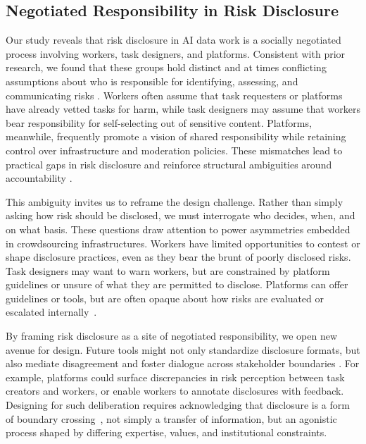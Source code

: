 \subsection{Negotiated Responsibility in Risk Disclosure}
Our study reveals that risk disclosure in AI data work is a socially negotiated process involving workers, task designers, and platforms. Consistent with prior research, we found that these groups hold distinct and at times conflicting assumptions about who is responsible for identifying, assessing, and communicating risks \cite{fieseler_unfairness_2019}. Workers often assume that task requesters or platforms have already vetted tasks for harm, while task designers may assume that workers bear responsibility for self-selecting out of sensitive content. Platforms, meanwhile, frequently promote a vision of shared responsibility while retaining control over infrastructure and moderation policies. These mismatches lead to practical gaps in risk disclosure and reinforce structural ambiguities around accountability \cite{Suchman2002LocatedAccountabilities, widder_dislocated_2023}.


This ambiguity invites us to reframe the design challenge. Rather than simply asking how risk should be disclosed, we must interrogate who decides, when, and on what basis. These questions draw attention to power asymmetries embedded in crowdsourcing infrastructures. Workers have limited opportunities to contest or shape disclosure practices, even as they bear the brunt of poorly disclosed risks. Task designers may want to warn workers, but are constrained by platform guidelines or unsure of what they are permitted to disclose. Platforms can offer guidelines or tools, but are often opaque about how risks are evaluated or escalated internally~\cite{roberts2019behind}.

By framing risk disclosure as a site of negotiated responsibility, we open new avenue for design. Future tools might not only standardize disclosure formats, but also mediate disagreement and foster dialogue across stakeholder boundaries \cite{fieseler_unfairness_2019}. For example, platforms could surface discrepancies in risk perception between task creators and workers, or enable workers to annotate disclosures with feedback. Designing for such deliberation requires acknowledging that disclosure is a form of boundary crossing~\cite{Suchman2002LocatedAccountabilities}, not simply a transfer of information, but an agonistic process shaped by differing expertise, values, and institutional constraints.

